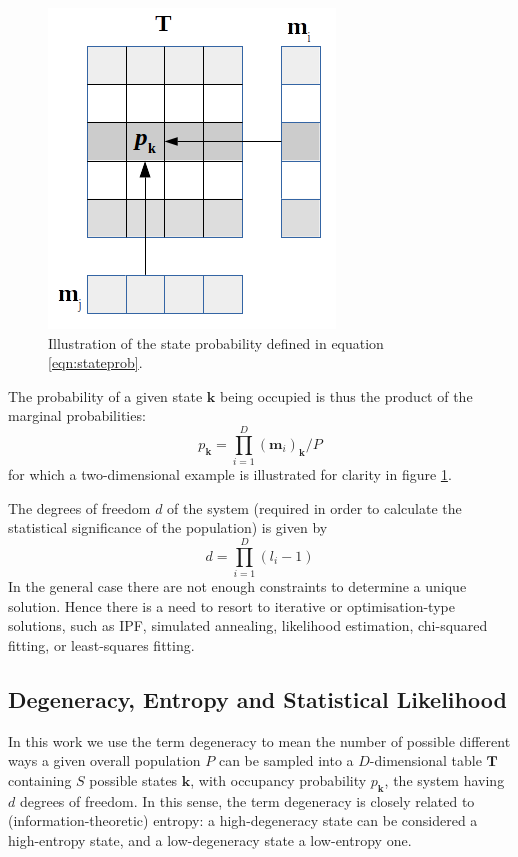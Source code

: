 \documentclass{JASSS}
\begin{document}
\begin{figure}[!t]
\centering
\includegraphics[width=0.35\linewidth]{figures/equation10} 
\caption{Illustration of the state probability defined in equation \ref{eqn:stateprob}.}
\label{fig:stateprob}
\end{figure}

The probability of a given state \(\mathbf{k}\) being occupied is thus
the product of the marginal probabilities:
\begin{equation}
p_{\mathbf{k}} = \prod\limits_{i=1}^{D}(\mathbf{m}_i)_\mathbf{k}/P
\label{eqn:stateprob}
\end{equation}
for which a two-dimensional example is illustrated for clarity in figure \ref{fig:stateprob}.

The degrees of freedom \(d\) of the system (required in order to
calculate the statistical significance of the population) is given by
\begin{equation}
d=\prod\limits_{i=1}^{D}(l_i-1)
\end{equation}
In the general case there are not enough constraints to determine a
unique solution. Hence there is a need to resort to iterative or
optimisation-type solutions, such as IPF, simulated annealing,
likelihood estimation, chi-squared fitting, or least-squares fitting.

\subsection{Degeneracy, Entropy and Statistical
Likelihood}\label{degeneracy-and-statistical-likelihood}

In this work we use the term degeneracy to mean the number of possible different
ways a given overall population \(P\) can be sampled into a \(D\)-dimensional table
\(\mathbf{T}\) containing \(S\) possible states \(\mathbf{k}\), with
occupancy probability \(p_\mathbf{k}\), the system having \(d\) degrees
of freedom. In this sense, the term degeneracy is closely related to (information-theoretic) entropy:
a high-degeneracy state can be considered a high-entropy state, and a low-degeneracy state a low-entropy one. 
\end{document}
